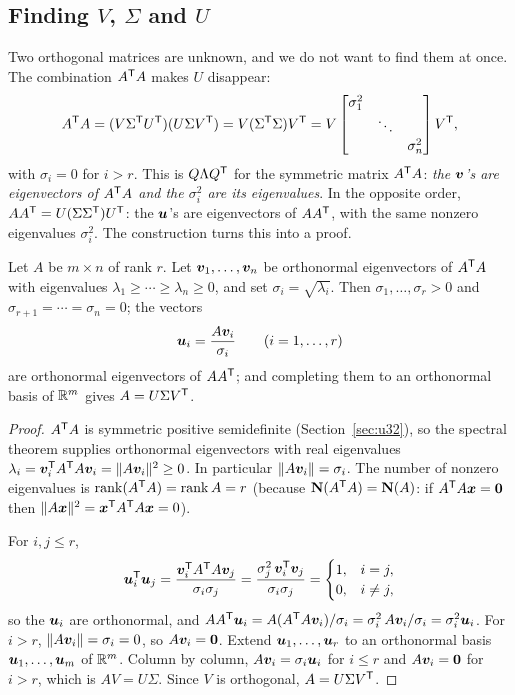 \subsection{Finding \texorpdfstring{$V$}{V}, \texorpdfstring{$\Sigma$}{Sigma} and \texorpdfstring{$U$}{U}}

Two orthogonal matrices are unknown, and we do not want to find them at once. The combination
$A^{\mathsf{T}} A$ makes $U$ disappear:
\[
  A^{\mathsf{T}} A=(V\Sigma^{\mathsf{T}} U^{\mathsf{T}})(U\Sigma V^{\mathsf{T}})=V(\Sigma^{\mathsf{T}}\Sigma)V^{\mathsf{T}}=V\begin{bmatrix}\sigma_1^2&&\\&\ddots&\\&&\sigma_n^2\end{bmatrix}V^{\mathsf{T}} ,
\]
with $\sigma_i=0$ for $i>r$. This is $Q\Lambda Q^{\mathsf{T}}$ for the symmetric matrix $A^{\mathsf{T}} A$: \emph{the $\boldsymbol{v}$'s
are eigenvectors of $A^{\mathsf{T}} A$ and the $\sigma_i^2$ are its eigenvalues}. In the opposite order,
$AA^{\mathsf{T}}=U(\Sigma\Sigma^{\mathsf{T}})U^{\mathsf{T}}$: the $\boldsymbol{u}$'s are eigenvectors of $AA^{\mathsf{T}}$, with the same nonzero
eigenvalues $\sigma_i^2$. The construction turns this into a proof.

\begin{theorem}\label{thm:u33-existence}
Let $A$ be $m\times n$ of rank $r$. Let $\boldsymbol{v}_1,\dots,\boldsymbol{v}_n$ be orthonormal eigenvectors of $A^{\mathsf{T}} A$ with
eigenvalues $\lambda_1\ge\cdots\ge\lambda_n\ge0$, and set $\sigma_i=\sqrt{\lambda_i}$. Then
$\sigma_1,\dots,\sigma_r>0$ and $\sigma_{r+1}=\cdots=\sigma_n=0$; the vectors
\[
  \boldsymbol{u}_i=\frac{A\boldsymbol{v}_i}{\sigma_i}\qquad(i=1,\dots,r)
\]
are orthonormal eigenvectors of $AA^{\mathsf{T}}$; and completing them to an orthonormal basis of $\mathbb{R}^m$
gives $A=U\Sigma V^{\mathsf{T}}$.
\end{theorem}
\begin{proof}
$A^{\mathsf{T}} A$ is symmetric positive semidefinite (Section~\ref{sec:u32}), so the spectral theorem
supplies orthonormal eigenvectors with real eigenvalues $\lambda_i=\boldsymbol{v}_i^{\mathsf{T}} A^{\mathsf{T}} A\boldsymbol{v}_i=\|A\boldsymbol{v}_i\|^2\ge0$.
In particular $\|A\boldsymbol{v}_i\|=\sigma_i$. The number of nonzero eigenvalues is $\operatorname{rank}(A^{\mathsf{T}} A)=\operatorname{rank} A=r$
(because $\mathbf{N}(A^{\mathsf{T}} A)=\mathbf{N}(A)$: if $A^{\mathsf{T}} A\boldsymbol{x}=\boldsymbol{0}$ then $\|A\boldsymbol{x}\|^2=\boldsymbol{x}^{\mathsf{T}} A^{\mathsf{T}} A\boldsymbol{x}=0$).

For $i,j\le r$,
\[
  \boldsymbol{u}_i^{\mathsf{T}}\boldsymbol{u}_j=\frac{\boldsymbol{v}_i^{\mathsf{T}} A^{\mathsf{T}} A\boldsymbol{v}_j}{\sigma_i\sigma_j}=\frac{\sigma_j^2\,\boldsymbol{v}_i^{\mathsf{T}}\boldsymbol{v}_j}{\sigma_i\sigma_j}
  =\begin{cases}1,&i=j,\\0,&i\ne j,\end{cases}
\]
so the $\boldsymbol{u}_i$ are orthonormal, and $AA^{\mathsf{T}}\boldsymbol{u}_i=A(A^{\mathsf{T}} A\boldsymbol{v}_i)/\sigma_i=\sigma_i^2\,A\boldsymbol{v}_i/\sigma_i=\sigma_i^2\boldsymbol{u}_i$.
For $i>r$, $\|A\boldsymbol{v}_i\|=\sigma_i=0$, so $A\boldsymbol{v}_i=\boldsymbol{0}$. Extend $\boldsymbol{u}_1,\dots,\boldsymbol{u}_r$ to an orthonormal basis
$\boldsymbol{u}_1,\dots,\boldsymbol{u}_m$ of $\mathbb{R}^m$. Column by column, $A\boldsymbol{v}_i=\sigma_i\boldsymbol{u}_i$ for $i\le r$ and $A\boldsymbol{v}_i=\boldsymbol{0}$ for
$i>r$, which is $AV=U\Sigma$. Since $V$ is orthogonal, $A=U\Sigma V^{\mathsf{T}}$.
\end{proof}

